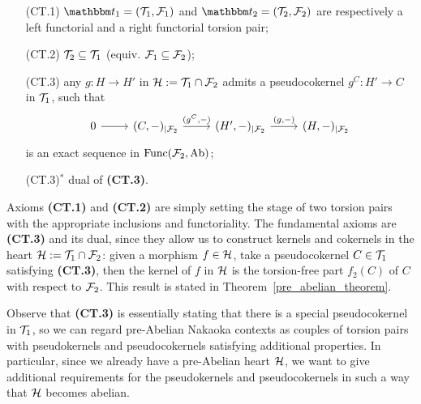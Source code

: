 \begin{enumerate}
  \item[(CT.1)] $\t_1=(\T_1,\F_1)$ and $\t_2=(\T_2,\F_2)$ are respectively a left functorial and a right functorial torsion pair;
  \item[(CT.2)] $\mathcal{T}_2\subseteq \mathcal{T}_1$ (equiv. $\mathcal{F}_1\subseteq\mathcal{F}_2$);
  \item[(CT.3)] any  $g\colon H\to H'$ in $\mathcal{H}:=\mathcal{T}_1\cap\mathcal{F}_2$ admits a pseudocokernel $g^C\colon H'\to C$ in $\mathcal{T}_1$, such that
    \begin{equation*}
      \begin{tikzcd}
        0\arrow{r} &(C,-)_{|\F_2}\arrow{r}{(g^C,-)} & (H',-)_{|\F_2}\arrow{r}{(g,-)}& (H,-)_{|\F_2}
      \end{tikzcd}
    \end{equation*}
    is an exact sequence in $\mathrm{Func}(\mathcal{F}_2,\mathrm{Ab})$;
  \item[(CT.3)$^\ast$] dual of \textbf{(CT.3)}.
\end{enumerate}

Axioms \textbf{(CT.1)} and \textbf{(CT.2)} are simply setting the stage of two torsion pairs with the appropriate inclusions and functoriality. The fundamental axioms are \textbf{(CT.3)} and its dual, since they allow us to construct kernels and cokernels in the heart $\mathcal{H}:=\mathcal{T}_1\cap\mathcal{F}_2$: given a morphism $f\in\mathcal{H}$, take a pseudocokernel $C\in\mathcal{T}_1$ satisfying \textbf{(CT.3)}, then the kernel of $f$ in $\mathcal{H}$ is the torsion-free part $f_2(C)$ of $C$ with respect to $\mathcal{F}_2$. This result is stated in Theorem~\ref{pre_abelian_theorem}.

Observe that \textbf{(CT.3)} is essentially stating that there is a special pseudocokernel in $\mathcal{T}_1$, so we can regard pre-Abelian Nakaoka contexts as couples of torsion pairs with pseudokernels and pseudocokernels satisfying additional properties. In particular, since we already have a pre-Abelian heart $\mathcal{H}$, we want to give additional requirements for the pseudokernels and pseudocokernels in such a way that $\mathcal{H}$ becomes abelian.

